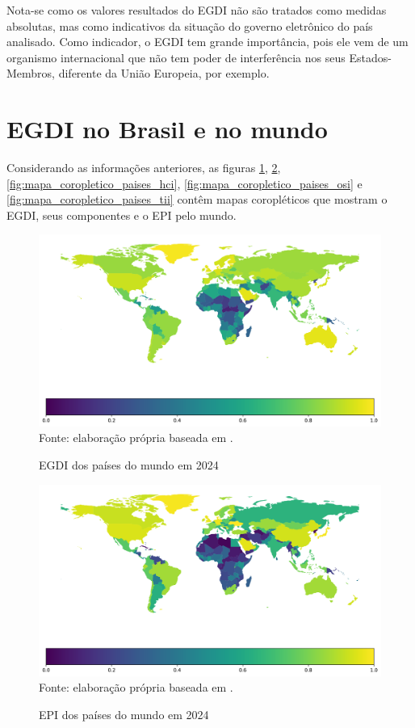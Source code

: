 Nota-se como os valores resultados do EGDI não são tratados como medidas absolutas, mas como indicativos da situação do governo eletrônico do país analisado. Como indicador, o EGDI tem grande importância, pois ele vem de um organismo internacional que não tem poder de interferência nos seus Estados-Membros, diferente da União Europeia, por exemplo.

\section{EGDI no Brasil e no mundo}

Considerando as informações anteriores, as figuras \ref{fig:mapa_coropletico_paises_egdi}, \ref{fig:mapa_coropletico_paises_epi}, \ref{fig:mapa_coropletico_paises_hci}, \ref{fig:mapa_coropletico_paises_osi} e \ref{fig:mapa_coropletico_paises_tii} contêm mapas coropléticos que mostram o EGDI, seus componentes e o EPI pelo mundo.

\begin{figure}[H]
	\centering
	\caption{EGDI dos países do mundo em 2024}
	\includegraphics[width=1\linewidth]{figuras/mapa_coropletico_paises_egdi}
	\label{fig:mapa_coropletico_paises_egdi}
	\footnotesize{Fonte: elaboração própria baseada em \cite{ONU_EGDI_dados}.}
\end{figure}

\begin{figure}[H]
	\centering
	\caption{EPI dos países do mundo em 2024}
	\includegraphics[width=1\linewidth]{figuras/mapa_coropletico_paises_epi}
	\label{fig:mapa_coropletico_paises_epi}
	\footnotesize{Fonte: elaboração própria baseada em \cite{ONU_EGDI_dados}.}
\end{figure}

